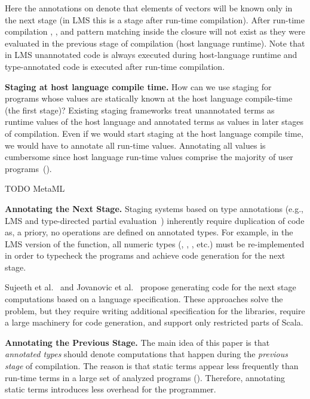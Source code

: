 Here the  annotations on  denote that elements of vectors will be known
 only in the next stage (in LMS this is a stage after run-time compilation). After run-time compilation ,
 , and pattern matching inside the closure will not exist
 as they were evaluated in the previous stage of compilation (host language runtime). Note that in
 LMS unannotated code is always executed during host-language runtime
 and type-annotated code is executed after run-time compilation.

{\bf Staging at host language compile time.} How can we use staging for programs whose values are statically
 known at the host language compile-time (the first stage)? Existing staging frameworks
 treat unannotated terms as runtime values of the host language and annotated terms as
 values in later stages of compilation. Even if we would start staging at the host language compile time,
 we would have to annotate all run-time values. Annotating all values is cumbersome
 since host language run-time values comprise the majority of user programs~().


TODO MetaML

{\bf Annotating the Next Stage.} Staging systems based on type annotations (e.g., LMS and type-directed
partial evaluation~\cite{danvy1999type}) inherently require duplication of code as,
a priory, no operations are defined on  annotated types. For example,
in the LMS version of the  function, all numeric types (\ie, , , etc.)
must be re-implemented in order to typecheck the programs and achieve code generation
for the next stage.

Sujeeth et al.~\cite{forge} and Jovanovic et al.~\cite{yin-yang}
 propose generating code for the next stage computations based on
 a language specification. These approaches solve the problem,
 but they require writing additional specification for the libraries,
 require a large machinery for code generation,
 and support only restricted parts of Scala.

{\bf Annotating the Previous Stage.} The main idea of this paper is that \emph{annotated types}
 should denote computations that happen during the \emph{previous stage} of compilation.
 The reason is that static terms appear less frequently than run-time terms in a large set
 of analyzed programs (). Therefore, annotating static terms
 introduces less overhead for the programmer.

